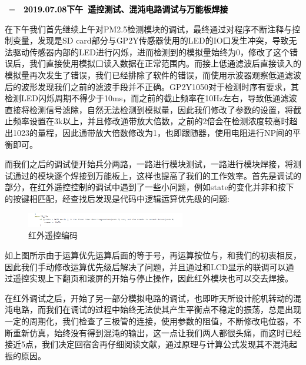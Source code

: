 \documentclass[a4paper, 11pt]{article} %
\makeatletter
\newlength\sidebar
\newlength\envborder
\def\esefcolorbox#1#{\esecolor@fbox{#1}}
\def\esecolor@fbox#1#2#3{%
   \color@b@x{\fboxsep\z@\color#1{#2}\fboxs}{\color#1{#3}}}
\newenvironment{eseframed}{%
   \def\FrameCommand{\fboxrule=\the\sidebar  \fboxsep=\the\envborder%
   \esefcolorbox{exampleborder}{examplebg}}%
   \MakeFramed{\FrameRestore}}%
  {\endMakeFramed}
\newcounter{diary}
\newenvironment{diary}[2]
 {\par\medskip\refstepcounter{diary}%
 \hbox{%
 \fboxsep=\the\sidebar\hspace{-\envborder}\hspace{-0.5\sidebar}%
 \colorbox{exampleborder}{%
 \hspace{\envborder}\footnotesize\sffamily\bfseries%
 \textcolor{black}{{#1}\ {#2}\enspace\hspace{\envborder}}
 }
 }
 \nointerlineskip\vspace{-\topsep}%
 \begin{eseframed}\noindent\ignorespaces%
 }
 {\end{eseframed}\vspace{-\baselineskip}\medskip}
\makeatother
\begin{document}
\begin{diary}{2019.07.08下午}{遥控测试、混沌电路调试与万能板焊接}
\par{}在下午我们首先继续上午对PM2.5检测模块的调试，最终通过对程序不断注释与控制变量，发现是SD card部分与GP2Y传感器使用的LED的IO口发生冲突，导致无法驱动传感器内部的LED进行闪烁，进而检测到的模拟量始终为0，修改了这个错误后，我们直接使用模拟口读入数据在正常范围内。而接上低通滤波后直接读入的模拟量再次发生了错误，我们已经排除了软件的错误，而使用示波器观察低通滤波后的波形发现我们之前的滤波手段并不正确。GP2Y1050对于检测时序有要求，其检测LED闪烁周期不得少于10ms，而之前的截止频率在10Hz左右，导致低通滤波直接将检测信号滤除，自然无法检测到模拟量，因此我们修改了参数的设置，将截止频率设置在3k以上，并且修改通带放大倍数，之前的2倍会在检测浓度较高时超出1023的量程，因此通带放大倍数修改为1，也即跟随器，使用电阻进行NP间的平衡即可。


而我们之后的调试便开始兵分两路，一路进行模块测试，一路进行模块焊接，将测试通过的模块逐个焊接到万能板上，这样也提高了我们的工作效率。首先是调试的部分，在红外遥控控制的调试中遇到了一些小问题，例如state的变化并非和按下的按键相匹配，经查找后发现是代码中逻辑运算优先级的问题:
\begin{figure}[H]
  \centering
  \includegraphics[width = 0.618\textwidth]{code1.png}
  \caption{红外遥控编码}
\end{figure}
如上图所示由于运算优先运算后面的等于号，再运算按位与，和我们的初衷相反，因此我们手动修改运算优先级后解决了问题，并且通过和LCD显示的联调可以通过遥控实现上下翻页和滚屏的开始与停止操作，因此红外模块也可以交去焊接。

在红外调试之后，开始了另一部分模拟电路的调试，也即昨天所设计舵机转动的混沌电路，而我们在调试的过程中始终无法使其产生平衡点不稳定的振荡，总是出现一定的周期化，我们检查了三极管的连接，使用参数的阻值，不断修改电位器，不断重新仿真，始终没有得到混沌的输出，这一点让我们两人都很头痛，而这时已经接近5点，我们决定回宿舍再仔细阅读文献，通过原理与计算公式发现其不混沌起振的原因。



\end{diary}
\end{document}
